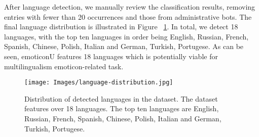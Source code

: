 After language detection, we manually review the classification results, removing entries with fewer than 20 occurrences and those from administrative bots. The final language distribution is illustrated in Figure ~\ref{fig:language-distribution}. In total, we detect 18 languages, with the top ten languages in order being English, Russian, French, Spanish, Chinese, Polish, Italian and German, Turkish, Portugese. As can be seen, emoticonU features 18 languages which is potentially viable for multilingualism emoticon-related task.

\begin{figure}[htbp]
    \centering
    \texttt{[image: Images/language-distribution.jpg]}
    \caption{Distribution of detected languages in the dataset. The dataset features over 18 languages. The top ten languages are English, Russian, French, Spanish, Chinese, Polish, Italian and German, Turkish, Portugese.}
    \label{fig:language-distribution}
\end{figure}


